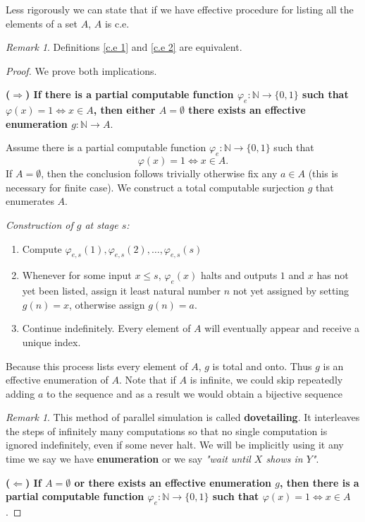 \documentclass{pracalicmgr2025}
\theoremstyle{plain}            %
\theoremstyle{remark}           %
\newtheorem{remark}[theorem]{Remark}
\theoremstyle{definition}       %
\begin{document}
Less rigorously we can state that if we have effective procedure for listing all the elements of a set $A$, $A$ is c.e.
\begin{remark}
    Definitions \ref{c.e 1} and \ref{c.e 2} are equivalent.
\end{remark}
\begin{proof}
We prove both implications.

\medskip
\noindent
\textbf{($\Rightarrow$) If there is a partial computable function $\varphi_e:\mathbb{N}\to\{0,1\}$ such that $\varphi(x)=1 \iff x\in A$, then either $A = \emptyset$ there exists an effective enumeration $g:\mathbb{N}\to A$}.

Assume there is a partial computable function $\varphi_e:\mathbb{N}\to\{0,1\}$ such that 
$$
\varphi(x)=1 \iff x\in A.
$$ 
If $A = \emptyset$, then the conclusion follows trivially otherwise fix any $a \in A$ (this is necessary for finite case). We construct a total computable surjection $g$ that enumerates $A$.

\emph{Construction of $g$ at stage $s$:}
\begin{enumerate}
    \item  Compute $\varphi_{e,s}(1),\varphi_{e,s}(2),\dots, \varphi_{e,s}(s)$ 
    \item Whenever for some input $x \le s$, $\varphi_e(x)$ halts and outputs $1$ and $x$ has not yet been listed, assign it least natural number $n$ not yet assigned by setting $g(n)=x$, otherwise assign $g(n) = a$.
    \item Continue indefinitely. Every element of $A$ will eventually appear and receive a unique index.
\end{enumerate}

Because this process lists every element of $A$, $g$ is total and onto. Thus $g$ is an effective enumeration of $A$. Note that if $A$ is infinite, we could skip repeatedly adding $a$ to the sequence and as a result we would obtain a bijective sequence 
\begin{remark}
    This method of parallel simulation is called \textbf{dovetailing}. It interleaves the steps of infinitely many computations so that no single computation is ignored indefinitely, even if some never halt. We will be implicitly using it any time we say we have\textbf{ enumeration} or we say \textit{"wait until $X$ shows in $Y$"}.
\end{remark}

\medskip
\noindent
\textbf{($\Leftarrow$) If $A = \emptyset$ or there exists an effective enumeration $g$, then there is a partial computable function $\varphi_e:\mathbb{N}\to\{0,1\}$ such that $\varphi(x)=1 \iff x\in A$}.


\end{proof}
\end{document}
